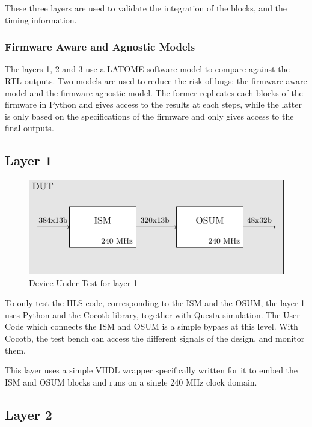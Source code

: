 These three layers are used to validate the integration of the blocks, and the timing information.

\subsubsection{Firmware Aware and Agnostic Models}

The layers 1, 2 and 3 use a LATOME software model to compare against the RTL outputs. Two models are used to reduce the risk of bugs: the firmware aware model and the firmware agnostic model. The former replicates each blocks of the firmware in Python and gives access to the results at each steps, while the latter is only based on the specifications of the firmware and only gives access to the final outputs.

\subsection{Layer 1}

\begin{figure}[htb]
    \centering
    \includegraphics{diagrams/l1}
    \caption{Device Under Test for layer 1}
    \label{fig:dut-l1}
\end{figure}

To only test the HLS code, corresponding to the ISM and the OSUM, the layer 1 uses Python and the Cocotb library, together with Questa simulation. The User Code which connects the ISM and OSUM is a simple bypass at this level. With Cocotb, the test bench can access the different signals of the design, and monitor them. 

This layer uses a simple VHDL wrapper specifically written for it to embed the ISM and OSUM blocks and runs on a single 240 MHz clock domain.

\subsection{Layer 2}

